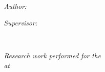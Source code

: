 \documentclass[
11pt, %
english, %
singlespacing, %
headsepline, %
]{MastersDoctoralThesis} %
\begin{document}
\begin{titlepage}
\begin{center}
\HRule \\[0.4cm] %
{\huge \bfseries \ttitle\par}\vspace{0.4cm} %
\HRule \\[1.5cm] %
 
\begin{minipage}[t]{0.4\textwidth}
\begin{flushleft} \large
\emph{Author:}\\
{\authorname} %
\end{flushleft}
\end{minipage}
\begin{minipage}[t]{0.4\textwidth}
\begin{flushright} \large
\emph{Supervisor:} \\
{\supname} %
\end{flushright}
\end{minipage}\\[3cm]
 
\vfill

\large \textit{Research work performed for the \degreename}\\[0.3cm] %
\textit{at}\\[0.4cm]

\begin{figure}[h]
    \centering
    \begin{subfigure}[t]{0.4\textwidth}
        \centering
    \end{subfigure}
    \begin{subfigure}[t]{0.4\textwidth}
        \centering
    \end{subfigure}
\end{figure}
\addtocounter{figure}{-1}


\end{center}
\end{titlepage}
\end{document}
